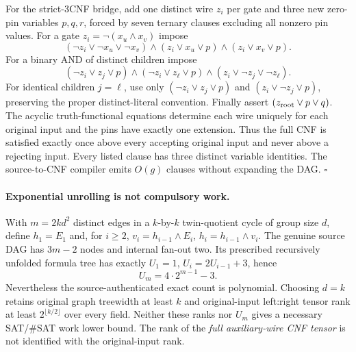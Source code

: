 \documentclass[11pt]{article}
\begin{document}
For the strict-3CNF bridge, add one distinct wire $z_i$ per gate and three new zero-pin variables $p,q,r$, forced by seven ternary clauses excluding all nonzero pin values. For a gate $z_i=\neg(x_u\wedge x_v)$ impose
\[
(\neg z_i\vee\neg x_u\vee\neg x_v)\wedge
(z_i\vee x_u\vee p)\wedge(z_i\vee x_v\vee p).
\]
For a binary AND of distinct children impose
\[
(\neg z_i\vee z_j\vee p)\wedge
(\neg z_i\vee z_\ell\vee p)\wedge
(z_i\vee\neg z_j\vee\neg z_\ell).
\]
For identical children $j=\ell$, use only $(\neg z_i\vee z_j\vee p)$ and $(z_i\vee\neg z_j\vee p)$, preserving the proper distinct-literal convention. Finally assert $(z_{\rm root}\vee p\vee q)$. The acyclic truth-functional equations determine each wire uniquely for each original input and the pins have exactly one extension. Thus the full CNF is satisfied exactly once above every accepting original input and never above a rejecting input. Every listed clause has three distinct variable identities. The source-to-CNF compiler emits $O(g)$ clauses without expanding the DAG. \hfill$\square$

\paragraph{Exponential unrolling is not compulsory work.}
With $m=2kd^2$ distinct edges in a $k$-by-$k$ twin-quotient cycle of group size $d$, define $h_1=E_1$ and, for $i\ge2$, $v_i=h_{i-1}\wedge E_i$, $h_i=h_{i-1}\wedge v_i$. The genuine source DAG has $3m-2$ nodes and internal fan-out two. Its prescribed recursively unfolded formula tree has exactly $U_1=1$, $U_i=2U_{i-1}+3$, hence
\[
U_m=4\cdot 2^{m-1}-3.
\]
Nevertheless the source-authenticated exact count is polynomial. Choosing $d=k$ retains original graph treewidth at least $k$ and original-input left:right tensor rank at least $2^{\lfloor k/2\rfloor}$ over every field. Neither these ranks nor $U_m$ gives a necessary SAT/\#SAT work lower bound. The rank of the \emph{full auxiliary-wire CNF tensor} is not identified with the original-input rank.
\end{document}
